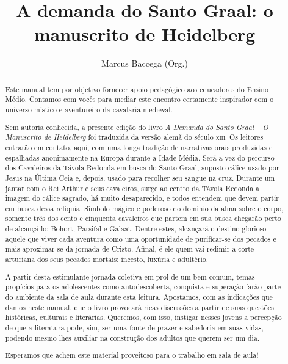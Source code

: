 \documentclass[11pt]{extarticle}
\begin{document}
\newcommand{\AutorLivro}{Marcus Baccega (Org.)}
\newcommand{\TituloLivro}{A demanda do Santo Graal: o manuscrito de Heidelberg}
\newcommand{\Tema}{Ficção, mistério e fantasia}
\newcommand{\Genero}{Conto, crônica e novela}
\newcommand{\imagemCapa}{./images/PNLD0006-01.png}
\newcommand{\issnppub}{978-65-994304-0-4}
\newcommand{\issnepub}{978-65-994304-1-1}
\newcommand{\colaborador}{Clarisse Assalim, Bruno Gradella e Vicente Castro}




\title{\TituloLivro}
\author{\AutorLivro}
\def\authornotes{\colaborador}

\date{}
\maketitle


\begin{abstract}

Este manual tem por objetivo fornecer apoio pedagógico aos educadores do 
Ensino Médio. Contamos com vocês para mediar este encontro certamente 
inspirador com o universo místico e aventureiro da cavalaria medieval.

Sem autoria conhecida, a presente edição do livro \emph{A Demanda do Santo Graal -- 
O Manuscrito de Heidelberg} foi traduzida da versão alemã do século \textsc{xiii}. 
Os leitores entrarão em contato, aqui, com uma longa tradição de narrativas orais 
produzidas e espalhadas anonimamente na Europa durante a Idade Média. Será a vez 
do percurso dos Cavaleiros da Távola Redonda em busca do Santo Graal, suposto 
cálice usado por Jesus na Última Ceia e, depois, usado para recolher seu sangue na cruz. 
Durante um jantar com o Rei Arthur e seus cavaleiros, surge ao centro da Távola Redonda 
a imagem do cálice sagrado, há muito desaparecido, e todos entendem que devem partir 
em busca dessa relíquia. Símbolo mágico e poderoso do domínio da alma sobre o corpo, 
somente três dos cento e cinquenta cavaleiros que partem em sua busca chegarão perto 
de alcançá-lo: Bohort, Parsifal e Galaat. Dentre estes, alcançará o destino glorioso 
aquele que viver cada aventura como uma oportunidade de purificar-se dos pecados e mais 
aproximar-se da jornada de Cristo. Afinal, é ele quem vai redimir a corte arturiana 
dos seus pecados mortais: incesto, luxúria e adultério.

A partir desta estimulante jornada coletiva em prol de um bem comum, temas 
propícios para os adolescentes como autodescoberta, conquista e superação 
farão parte do ambiente da sala de aula durante esta leitura. Apostamos, 
com as indicações que damos neste manual, que o livro provocará ricas 
discussões a partir de suas questões históricas, culturais e literárias. 
Queremos, com isso, instigar nesses jovens a percepção de que a literatura 
pode, sim, ser uma fonte de prazer e sabedoria em suas vidas, podendo mesmo 
lhes auxiliar na construção dos adultos que querem ser um dia. 

Esperamos que achem este material proveitoso para o trabalho em sala de aula!

\end{abstract}
\end{document}
